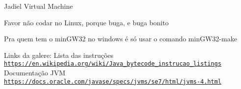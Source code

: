 Jadiel Virtual Machine

Favor não codar no Linux, porque buga, e buga bonito

Pra quem tem o min\+G\+W32 no windows é só usar o comando min\+G\+W32-\/make

Links da galere\+: Lista das instruções \href{https://en.wikipedia.org/wiki/Java_bytecode_instruction_listings}{\tt https\+://en.\+wikipedia.\+org/wiki/\+Java\+\_\+bytecode\+\_\+instrucao\+\_\+listings} Documentação J\+VM \href{https://docs.oracle.com/javase/specs/jvms/se7/html/jvms-4.html}{\tt https\+://docs.\+oracle.\+com/javase/specs/jvms/se7/html/jvms-\/4.\+html}